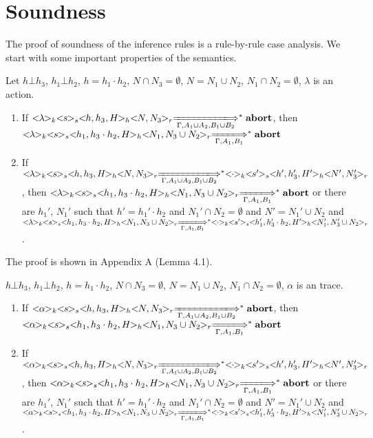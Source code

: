 \documentclass{lmcs} %
\theoremstyle{plain}\newtheorem{satz}[thm]{Satz} %
\begin{document}
\section{Soundness}
The proof of soundness of the inference rules is a rule-by-rule case analysis. We start with some important properties of the semantics.
\begin{lem}
Let $h\bot h_3$, $h_1\bot h_2$, $h=h_1\cdot h_2$, $N \cap N_3=\emptyset$, $N=N_1 \cup N_2$, $N_1 \cap N_2=\emptyset$, $\lambda$ is an action.
\begin{enumerate}
\item If $<\!\!\lambda\!\!>_k<\!\!s\!\!>_s<\!\!h,h_3,H\!\!>_h<\!\!N,N_3\!\!>_r\xLongrightarrow[\Gamma, A_1\cup A_2, B_1\cup B_2]{}^*\mathbf{abort}$, then $<\!\!\lambda\!\!>_k<\!\!s\!\!>_s<\!\!h_1,h_3\cdot h_2,H\!\!>_h<\!\!N_1,N_3\cup N_2\!\!>_r\xLongrightarrow[\Gamma, A_1,B_1]{}^*\mathbf{abort}$
\item If $<\!\!\lambda\!\!>_k<\!\!s\!\!>_s<\!\!h,h_3,H\!\!>_h<\!\!N,N_3\!\!>_r\xLongrightarrow[\Gamma, A_1\cup A_2, B_1\cup B_2]{}^*<\!\!\cdot\!\!>_k<\!\!s'\!\!>_s<\!\!h',h_3',H'\!\!>_h<\!\!N',N_3'\!\!>_r$, then $<\!\!\lambda\!\!>_k<\!\!s\!\!>_s<\!\!h_1,h_3\cdot h_2,H\!\!>_h<\!\!N_1,N_3\cup N_2\!\!>_r\xLongrightarrow[\Gamma, A_1, B_1]{}^*\mathbf{abort}$ or there are $h_1'$, $N_1'$ such that $h'=h_1'\cdot h_2$ and $N_1'\cap N_2=\emptyset$ and $N'=N_1'\cup N_2$ and $<\!\!\lambda\!\!>_k<\!\!s\!\!>_s<\!\!h_1,h_3\cdot h_2,H\!\!>_h<\!\!N_1,N_3\cup N_2\!\!>_r\xLongrightarrow[\Gamma, A_1, B_1]{}^*<\!\!\cdot\!\!>_k<\!\!s'\!\!>_s<\!\!h_1',h_3'\cdot h_2,H'\!\!>_h<\!\!N_1',N_3'\cup N_2\!\!>_r$.
\end{enumerate}
\end{lem}
The proof is shown in Appendix A (Lemma 4.1).
\begin{lem}
$h\bot h_3$, $h_1\bot h_2$, $h=h_1\cdot h_2$, $N \cap N_3=\emptyset$, $N=N_1 \cup N_2$, $N_1 \cap N_2=\emptyset$, $\alpha$ is an trace.
\begin{enumerate}
\item If $<\!\!\alpha\!\!>_k<\!\!s\!\!>_s<\!\!h,h_3,H\!\!>_h<\!\!N,N_3\!\!>_r\xLongrightarrow[\Gamma, A_1\cup A_2, B_1\cup B_2]{}^*\mathbf{abort}$, then $<\!\!\alpha\!\!>_k<\!\!s\!\!>_s<\!\!h_1,h_3\cdot h_2,H\!\!>_h<\!\!N_1,N_3\cup N_2\!\!>_r\xLongrightarrow[\Gamma, A_1,B_1]{}^*\mathbf{abort}$
\item If $<\!\!\alpha\!\!>_k<\!\!s\!\!>_s<\!\!h,h_3,H\!\!>_h<\!\!N,N_3\!\!>_r\xLongrightarrow[\Gamma, A_1\cup A_2, B_1\cup B_2]{}^*<\!\!\cdot\!\!>_k<\!\!s'\!\!>_s<\!\!h',h_3',H'\!\!>_h<\!\!N',N_3'\!\!>_r$, then $<\!\!\alpha\!\!>_k<\!\!s\!\!>_s<\!\!h_1,h_3\cdot h_2,H\!\!>_h<\!\!N_1,N_3\cup N_2\!\!>_r\xLongrightarrow[\Gamma, A_1, B_1]{}^*\mathbf{abort}$ or there are $h_1'$, $N_1'$ such that $h'=h_1'\cdot h_2$ and $N_1'\cap N_2=\emptyset$ and $N'=N_1'\cup N_2$ and $<\!\!\alpha\!\!>_k<\!\!s\!\!>_s<\!\!h_1,h_3\cdot h_2,H\!\!>_h<\!\!N_1,N_3\cup N_2\!\!>_r\xLongrightarrow[\Gamma, A_1, B_1]{}^*<\!\!\cdot\!\!>_k<\!\!s'\!\!>_s<\!\!h_1',h_3'\cdot h_2,H'\!\!>_h<\!\!N_1',N_3'\cup N_2\!\!>_r$.
\end{enumerate}
\end{lem}
\end{document}
